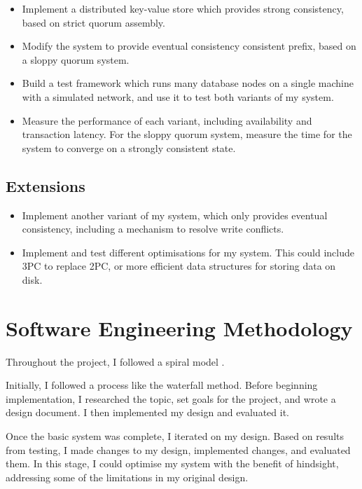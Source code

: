 \documentclass[12pt,a4paper,twoside,openany]{report}
\begin{document}
\begin{itemize}
\item
Implement a distributed key-value store which provides strong consistency, based on strict quorum assembly.

\item
Modify the system to provide eventual consistency consistent prefix, based on a sloppy quorum system.

\item
Build a test framework which runs many database nodes on a single machine with a simulated network, and use it to test both variants of my system.

\item
Measure the performance of each variant, including availability  and transaction latency. For the sloppy quorum system, measure the time for the system to converge on a strongly consistent state.

\end{itemize}

\subsection{Extensions}

\begin{itemize}
\item
Implement another variant of my system, which only provides eventual consistency, including a mechanism to resolve write conflicts.

\item
Implement and test different optimisations for my system. This could include 3PC to replace 2PC, or more efficient data structures for storing data on disk.

\end{itemize}

\section{Software Engineering Methodology}

Throughout the project, I followed a spiral model \cite{boehm1988spiral}.

Initially, I followed a process like the waterfall method. Before beginning implementation, I researched the topic, set goals for the project, and wrote a design document. I then implemented my design and evaluated it.

Once the basic system was complete, I iterated on my design. Based on results from testing, I made changes to my design, implemented changes, and evaluated them. In this stage, I could optimise my system with the benefit of hindsight, addressing some of the limitations in my original design.
\end{document}
